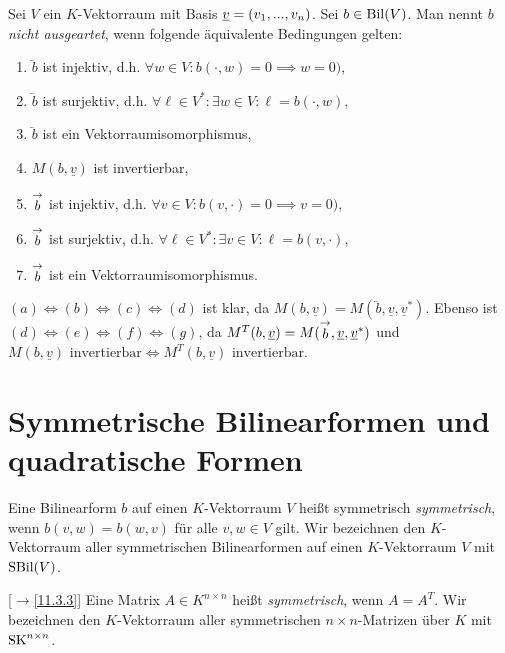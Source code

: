 \documentclass[../../main.tex]{subfiles}
\begin{document}
\begin{defprop}\label{13.3.11}
Sei $V$ ein $K$-Vektorraum mit Basis ${\underline v}=(v_1,...,v_n)$. Sei $b\in \operatorname{Bil}(V)$. Man nennt $b$ \emph{nicht ausgeartet}, wenn folgende äquivalente Bedingungen gelten:
\begin{enumerate}[\normalfont(a)]
\item $\lvec b$ ist injektiv, d.h. $\forall w\in V: b(\cdot, w)=0\implies w=0)$,
\item $\lvec b$ ist surjektiv, d.h. $\forall \ell\in V^*: \exists w\in V: \ell=b(\cdot,w)$,
\item $\lvec b$ ist ein Vektorraumisomorphismus,
\item $M(b,\underline{v})$ ist invertierbar,
\item $\stackrel{\rightarrow}{b}$ ist injektiv, d.h. $\forall v\in V: b(v, \cdot)=0\implies v=0)$,
\item $\stackrel{\rightarrow}{b}$ ist surjektiv, d.h. $\forall \ell\in V^*: \exists v\in V: \ell=b(v,\cdot)$,
\item $\stackrel{\rightarrow}{b}$ ist ein Vektorraumisomorphismus.
\end{enumerate}
\end{defprop}
\begin{cproof}
$(a)\Longleftrightarrow(b)\Longleftrightarrow(c)\Longleftrightarrow(d)$ ist klar, da $M(b,\underline{v})=M(\lvec b,\underline{v},\underline{v}^*)$. Ebenso ist $(d)\Longleftrightarrow(e)\Longleftrightarrow(f)\Longleftrightarrow(g)$, da $M^T(b,\underline{v})=M(\stackrel{\rightarrow}{b},\underline{v},\underline{v}^*)$ und $M(b,\underline{v})\text{ invertierbar}\Longleftrightarrow M^T(b,\underline{v})\text{ invertierbar}$.
\end{cproof}

\section{Symmetrische Bilinearformen und quadratische Formen}

\begin{df}\label{13.4.1}
Eine Bilinearform $b$ auf einen $K$-Vektorraum $V$ heißt symmetrisch \emph{symmetrisch}, wenn $b(v,w)=b(w,v)$ für alle $v,w\in V$ gilt. Wir bezeichnen den $K$-Vektorraum aller symmetrischen Bilinearformen auf einen $K$-Vektorraum $V$ mit $\operatorname{SBil}(V)$.
\end{df}	
	
\begin{df}\label{13.4.2}
[$\to$\ref{11.3.3}] Eine Matrix $A\in K^{n\times n}$ heißt \emph{symmetrisch}, wenn $A=A^T$. Wir bezeichnen den $K$-Vektorraum aller symmetrischen $n\times n$-Matrizen über $K$ mit $\operatorname{SK}^{n\times n}$.
\end{df}
	
\end{document}
